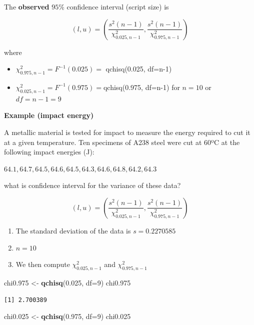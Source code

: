 \documentclass[
]{book}
\newenvironment{Shaded}{\begin{snugshade}}{\end{snugshade}}
\newcommand{\AttributeTok}[1]{\textcolor[rgb]{0.13,0.29,0.53}{#1}}
\newcommand{\DecValTok}[1]{\textcolor[rgb]{0.00,0.00,0.81}{#1}}
\newcommand{\FloatTok}[1]{\textcolor[rgb]{0.00,0.00,0.81}{#1}}
\newcommand{\FunctionTok}[1]{\textcolor[rgb]{0.13,0.29,0.53}{\textbf{#1}}}
\newcommand{\NormalTok}[1]{#1}
\newcommand{\OtherTok}[1]{\textcolor[rgb]{0.56,0.35,0.01}{#1}}
\begin{document}
The \textbf{observed} \(95\%\) confidence interval (script size) is

\[(l,u) = (\frac{s^2 (n-1)}{\chi^2_{0.025,n-1}},\frac{s^2(n-1)}{\chi^2_{0.975,n-1}})\]

where

\begin{itemize}
\item
  \(\chi^2_{0.975,n-1}=F^{-1}(0.025)=\) qchisq(0.025, df=n-1)
\item
  \(\chi^2_{0.025,n-1}=F^{-1}(0.975)=\)qchisq(0.975, df=n-1)
  for \(n=10\) or \(df=n-1=9\)
\end{itemize}

\textbf{Example (impact energy)}

A metallic material is tested for impact to measure the energy required to cut it at a given temperature. Ten specimens of A238 steel were cut at 60ºC at the following impact energies (J):

\(64.1, 64.7, 64.5, 64.6, 64.5, 64.3, 64.6, 64.8, 64.2, 64.3\)

what is confidence interval for the variance of these data?

\[(l,u) = (\frac{s^2 (n-1)}{\chi^2_{0.025,n-1}},\frac{s^2(n-1)}{\chi^2_{0.975,n-1}})\]

\begin{enumerate}
\def\labelenumi{\arabic{enumi}.}
\item
  The standard deviation of the data is \(s=0.2270585\)
\item
  \(n=10\)
\item
  We then compute \(\chi^2_{0.025,n-1}\) and \(\chi^2_{0.975,n-1}\)
\end{enumerate}

\begin{Shaded}
\begin{Highlighting}[]
\NormalTok{chi0}\FloatTok{.975} \OtherTok{\textless{}{-}} \FunctionTok{qchisq}\NormalTok{(}\FloatTok{0.025}\NormalTok{, }\AttributeTok{df=}\DecValTok{9}\NormalTok{)}
\NormalTok{chi0}\FloatTok{.975}
\end{Highlighting}
\end{Shaded}

\begin{verbatim}
[1] 2.700389
\end{verbatim}

\begin{Shaded}
\begin{Highlighting}[]
\NormalTok{chi0}\FloatTok{.025} \OtherTok{\textless{}{-}} \FunctionTok{qchisq}\NormalTok{(}\FloatTok{0.975}\NormalTok{, }\AttributeTok{df=}\DecValTok{9}\NormalTok{)}
\NormalTok{chi0}\FloatTok{.025}
\end{Highlighting}
\end{Shaded}
\end{document}
